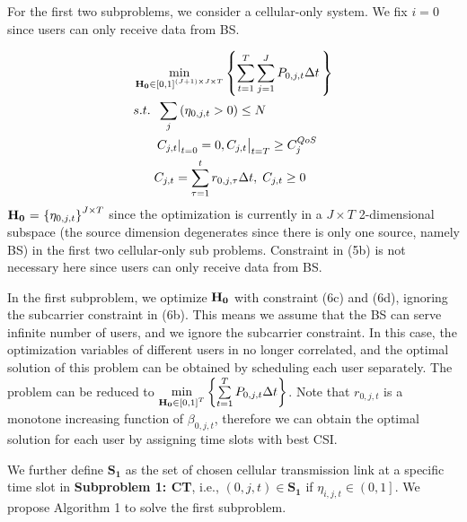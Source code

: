 \documentclass{ieeeaccess}
\begin{document}
For the first two subproblems, we consider a cellular-only system. We fix $i = 0$ since users can only receive data from BS.

\begin{subequations}
\begin{align}
& \mathop {\min }\limits_{{\mathbf{{\rm H}}}_{\mathbf{0}} \in {{\left[ {0,1} \right]}^{\left( {J + 1} \right) \times J \times T}}} \left\{ {\sum\limits_{t = 1}^T {\sum\limits_{j = 1}^J {{P_{0,j,t}}\Delta t} \,} } \right\} \\
& {s.t.} \;\; \sum\limits_j  {\left( {{\eta _{0,j,t}} > 0} \right)}   \le N \\
& \;\;\;\;\;\; {\left. {{{\left. {{C_{j,t}}} \right|}_{t = 0}} = 0, {C_{j,t}}} \right|_{t = T}} \ge C_j^{QoS} \\
& \;\;\;\;\;\; {C_{j,t}} = \sum\limits_{\tau  = 1}^t {{r_{0,j,\tau }}\Delta t} ,\; {C_{j,t}} \ge 0
\end{align}
\end{subequations}
${{\mathbf{{\rm H}}}_{\mathbf{0}}}{\text{ = }}{\left\{ {{\eta _{0,j,t}}} \right\}^{J \times T}}$ since the optimization is currently in a $J \times T$ 2-dimensional subspace (the source dimension degenerates since there is only one source, namely BS) in the first two cellular-only sub problems. Constraint in (5b) is not necessary here since users can only receive data from BS.

In the first subproblem, we optimize ${{\mathbf{{\rm H}}}_{\mathbf{0}}}$ with constraint (6c) and (6d), ignoring the subcarrier constraint in (6b). This means we assume that the BS can serve infinite number of users, and we ignore the subcarrier constraint. In this case, the optimization variables of different users in no longer correlated, and the optimal solution of this problem can be obtained by scheduling each user separately. The problem can be reduced to $\mathop {\min }\limits_{{{\mathbf{{\rm H}}}_{\mathbf{0}}} \in {{\left[ {0,1} \right]}^T}} \left\{ {\sum\limits_{t = 1}^T {{P_{0,j,t}}\Delta t} } \right\}$. Note that ${r_{0,j,t}}$ is a monotone increasing function of ${\beta _{0,j,t}}$, therefore we can obtain the optimal solution for each user by assigning time slots with best CSI. 

We further define ${{\mathbf{S}}_{\mathbf{1}}}$ as the set of chosen cellular transmission link at a specific time slot in \textbf{Subproblem 1: CT}, i.e., $\left( {0,j,t} \right) \in {\mathbf{S}}_{\mathbf{1}}$ if ${\eta _{i,j,t}} \in \left( {0,1} \right]$. We propose Algorithm 1 to solve the first subproblem.
\end{document}
